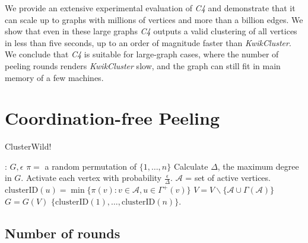 \documentclass{article} %
\begin{document}
We provide an extensive experimental evaluation of   {\it{C4}} and demonstrate that it can scale up to graphs with millions of vertices and more than a billion edges.
We show that even in these large graphs  {\it{C4}} outputs a valid clustering of all vertices in less than five seconds, up to an order of magnitude faster than {\it{KwikCluster}}.
We conclude that {\it{C4}}  is suitable for large-graph cases, where the number of peeling rounds renders {\it{KwikCluster}} slow, and the graph can still fit in main memory of a few machines.


\section{Coordination-free Peeling}

\begin{algorithm}[H]
   \caption{ClusterWild!}
          \footnotesize{
\begin{algorithmic}[1]
: $G, \epsilon$
\STATE $\pi=$ a random permutation of $\{1,\ldots, n\}$
\STATE Calculate $\Delta$, the maximum degree in $G$.
\STATE Activate each vertex with probability $\frac{\epsilon}{\Delta}$.
\STATE $\mathcal{A}$ = set of active vertices. 
{}
\STATE $\text{clusterID}(u) = \min \{\pi(v): v\in \mathcal{A}, u\in\Gamma^+(v)\}$
\ENDFOR
\STATE $V = V\backslash \{ \mathcal{A}\cup \Gamma( \mathcal{A})\}$
\STATE $G = G(V)$
\ENDWHILE
  $\{\text{clusterID}(1),\ldots, \text{clusterID}(n)\}$.
\end{algorithmic}
}
   \label{alg:rank_d_opt}
 \end{algorithm}




\subsection{Number of rounds}
\end{document}
